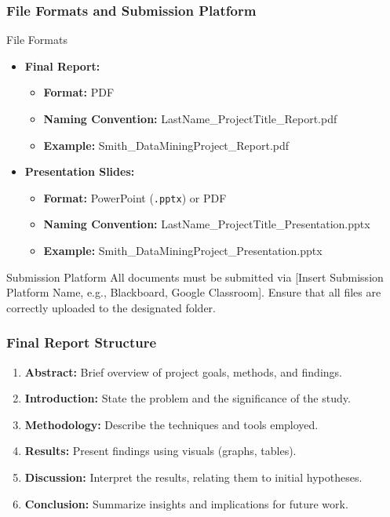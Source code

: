 \documentclass[aspectratio=169]{beamer}
\begin{document}
\begin{frame}[fragile]
    \frametitle{File Formats and Submission Platform}
    \begin{block}{File Formats}
        \begin{itemize}
            \item \textbf{Final Report:}
                \begin{itemize}
                    \item \textbf{Format:} PDF
                    \item \textbf{Naming Convention:} LastName\_ProjectTitle\_Report.pdf
                    \item \textbf{Example:} Smith\_DataMiningProject\_Report.pdf
                \end{itemize}
            \item \textbf{Presentation Slides:}
                \begin{itemize}
                    \item \textbf{Format:} PowerPoint (\texttt{.pptx}) or PDF
                    \item \textbf{Naming Convention:} LastName\_ProjectTitle\_Presentation.pptx
                    \item \textbf{Example:} Smith\_DataMiningProject\_Presentation.pptx
                \end{itemize}
        \end{itemize}
    \end{block}

    \begin{block}{Submission Platform}
        All documents must be submitted via [Insert Submission Platform Name, e.g., Blackboard, Google Classroom]. Ensure that all files are correctly uploaded to the designated folder.
    \end{block}
\end{frame}

\begin{frame}[fragile]
    \frametitle{Final Report Structure}
    \begin{enumerate}
        \item \textbf{Abstract:} Brief overview of project goals, methods, and findings.
        \item \textbf{Introduction:} State the problem and the significance of the study.
        \item \textbf{Methodology:} Describe the techniques and tools employed.
        \item \textbf{Results:} Present findings using visuals (graphs, tables).
        \item \textbf{Discussion:} Interpret the results, relating them to initial hypotheses.
        \item \textbf{Conclusion:} Summarize insights and implications for future work.
    \end{enumerate}
\end{frame}
\end{document}
